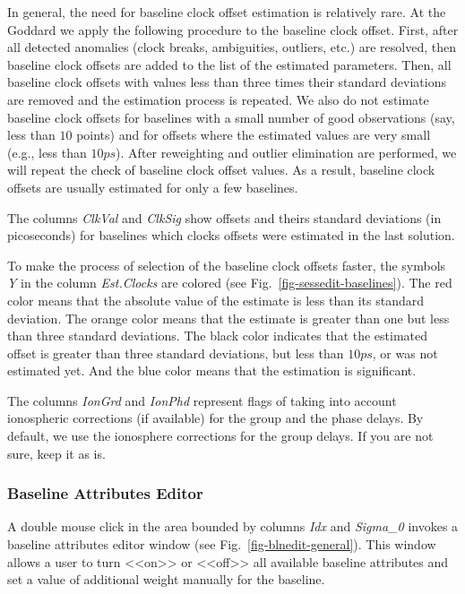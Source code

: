 \documentclass [10pt,letterpaper]{report}
\begin{document}
In general, the need for baseline clock offset estimation is relatively
rare. At the Goddard we apply the following procedure to the baseline
clock offset. First, after all detected anomalies (clock breaks,
ambiguities, outliers, etc.) are resolved, then baseline clock offsets
are added to the list of the estimated parameters. Then, all baseline
clock offsets with values less than three times their standard
deviations are removed and the estimation process is repeated. We also
do not estimate baseline clock offsets for baselines with a small number
of good observations (say, less than $10$ points) and for offsets where
the estimated values are very small (e.g., less than $10ps$). After
reweighting and outlier elimination are performed, we will repeat the
check of baseline clock offset values. As a result, baseline clock
offsets are usually estimated for only a few baselines.

The columns {\sl ClkVal} and {\sl ClkSig} show offsets and theirs
standard deviations (in picoseconds) for baselines which clocks offsets
were estimated in the last solution.

To make the process of selection of the baseline clock offsets faster,
the symbols {\sl Y} in the column {\sl Est.Clocks} are colored (see
Fig.~\ref{fig-sessedit-baselines}). The red color means that the
absolute value of the estimate is less than its standard deviation. The
orange color means that the estimate is greater than one but less than
three standard deviations. The black color indicates that the estimated
offset is greater than three standard deviations, but less than $10ps$,
or was not estimated yet. And the blue color means that the estimation
is significant.

The columns {\sl IonGrd} and {\sl IonPhd} represent flags of taking into
account ionospheric corrections (if available) for the group and the phase
delays. By default, we use the ionosphere corrections for the group delays.
If you are not sure, keep it as is.


\subsubsection{Baseline Attributes Editor}
\label{subsubsect-sessedit-baselines-blneditor}
A double mouse click in the area bounded by columns {\sl Idx} and {\sl
Sigma\_0} invokes a baseline attributes editor window (see
Fig.~\ref{fig-blnedit-general}). This window allows a user to turn
<<on>> or <<off>> all available baseline attributes and set a value of
additional weight manually for the baseline.
\end{document}
